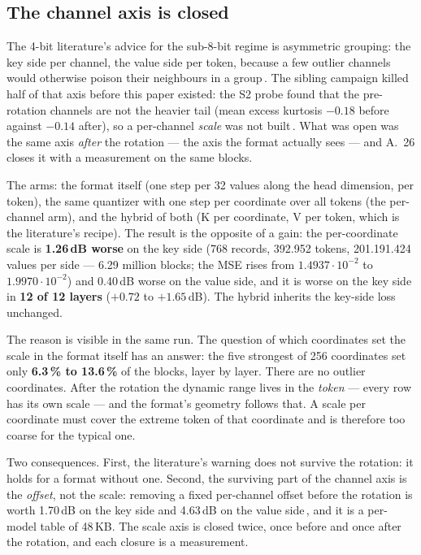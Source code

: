 \documentclass[10pt,twocolumn]{article}
\begin{document}
\subsection{The channel axis is closed}
\label{sec:channel}

The 4-bit literature's advice for the sub-8-bit regime is asymmetric grouping: the key side per channel,
the value side per token, because a few outlier channels would otherwise poison their neighbours in a
group\,\cite{kivi}. The sibling campaign killed half of that axis before this paper existed: the S2 probe
found that the pre-rotation channels are not the heavier tail (mean excess kurtosis $-0.18$ before against
$-0.14$ after), so a per-channel \emph{scale} was not built\,\cite{shear}. What was open was the same axis
\emph{after} the rotation --- the axis the format actually sees --- and A.~26 closes it with a measurement
on the same blocks.

The arms: the format itself (one step per 32 values along the head dimension, per token), the same
quantizer with one step per coordinate over all tokens (the per-channel arm), and the hybrid of both
(K per coordinate, V per token, which is the literature's recipe). The result is the opposite of a gain:
the per-coordinate scale is \textbf{1.26\,dB worse} on the key side (768 records, 392.952 tokens, 201.191.424
values per side --- 6.29 million blocks; the MSE rises from $1.4937\cdot10^{-2}$ to
$1.9970\cdot10^{-2}$) and 0.40\,dB worse on the value side, and it is worse on the key side in
\textbf{12 of 12 layers} ($+0.72$ to $+1.65$\,dB). The hybrid inherits the key-side loss unchanged.

The reason is visible in the same run. The question of which coordinates set the scale in the format
itself has an answer: the five strongest of 256 coordinates set only \textbf{6.3\,\% to 13.6\,\%} of the
blocks, layer by layer. There are no outlier coordinates. After the rotation the dynamic range lives in
the \emph{token} --- every row has its own scale --- and the format's geometry follows that. A scale per
coordinate must cover the extreme token of that coordinate and is therefore too coarse for the typical
one.

Two consequences. First, the literature's warning does not survive the rotation: it holds for a format
without one. Second, the surviving part of the channel axis is the \emph{offset}, not the scale: removing a
fixed per-channel offset before the rotation is worth 1.70\,dB on the key side and 4.63\,dB on the value
side\,\cite{shear}, and it is a per-model table of 48\,KB. The scale axis is closed twice, once before and
once after the rotation, and each closure is a measurement.
\end{document}

